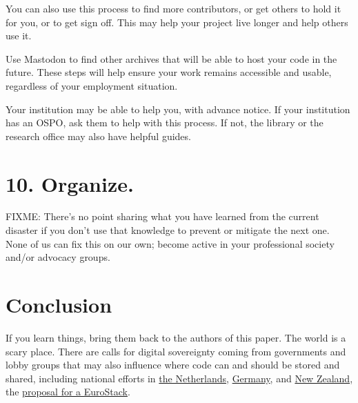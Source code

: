 \documentclass[10pt,letterpaper]{article}
\begin{document}
You can also use this process to find more contributors,
or get others to hold it for you,
or to get sign off.
This may help your project live longer and help others use it.

Use Mastodon to find other archives that will be able to host your code in the future.
These steps will help ensure your work remains accessible and usable,
regardless of your employment situation.

Your institution may be able to help you,
with advance notice.
If your institution has an OSPO,
ask them to help with this process.
If not,
the library or the research office may also have helpful guides.

\section*{10. Organize.}

FIXME:
There's no point sharing what you have learned from the current disaster
if you don't use that knowledge to prevent or mitigate the next one.
None of us can fix this on our own;
become active in your professional society and/or advocacy groups.

\section*{Conclusion}

If you learn things, bring them back to the authors of this paper.
The world is a scary place.
\cite{Tamburri2020}
  There are calls for digital sovereignty coming from governments and lobby groups
  that may also influence where code can and should be stored and shared,
  including national efforts in
  \href{https://www.reuters.com/world/europe/dutch-parliament-calls-end-reliance-us-software-2025-03-18/}{the Netherlands},
  \href{https://www.sovereign.tech/}{Germany},
  and \href{https://zenodo.org/records/15080979}{New Zealand},
  the \href{https://www.politico.eu/article/push-for-eurostack-as-eu-us-tech-tensions-grow/}{proposal for a EuroStack}.


\end{document}
